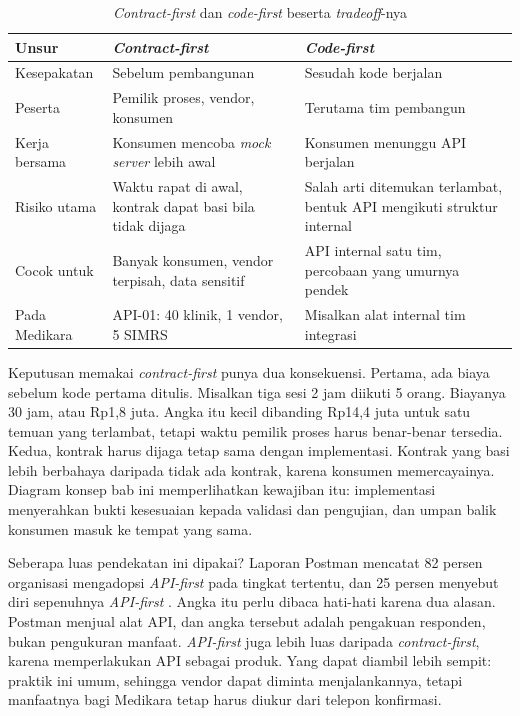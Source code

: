 \begin{table}[!htb]
  \centering
  \caption{\textit{Contract-first} dan \textit{code-first} beserta \textit{tradeoff}-nya}
  \label{tab:ch09-contract-first}
  \footnotesize
  \begin{tabularx}{\textwidth}{H{2.8cm}GG}
    \hline
    \textbf{Unsur} & \textbf{\textit{Contract-first}} & \textbf{\textit{Code-first}} \\ \hline
    Kesepakatan & Sebelum pembangunan & Sesudah kode berjalan \\ \hline
    Peserta & Pemilik proses, vendor, konsumen & Terutama tim pembangun \\ \hline
    Kerja bersama & Konsumen mencoba \textit{mock server} lebih awal & Konsumen menunggu API berjalan \\ \hline
    Risiko utama & Waktu rapat di awal, kontrak dapat basi bila tidak dijaga & Salah arti ditemukan terlambat, bentuk API mengikuti struktur internal \\ \hline
    Cocok untuk & Banyak konsumen, vendor terpisah, data sensitif & API internal satu tim, percobaan yang umurnya pendek \\ \hline
    Pada Medikara & API-01: 40 klinik, 1 vendor, 5 SIMRS & Misalkan alat internal tim integrasi \\ \hline
  \end{tabularx}
\end{table}

Keputusan memakai \textit{contract-first} punya dua konsekuensi. Pertama, ada biaya sebelum kode pertama ditulis. Misalkan tiga sesi
2 jam diikuti 5 orang. Biayanya 30 jam, atau Rp1,8 juta. Angka itu kecil dibanding Rp14,4 juta untuk satu temuan yang terlambat, tetapi
waktu pemilik proses harus benar-benar tersedia. Kedua, kontrak harus dijaga tetap sama dengan implementasi. Kontrak yang basi lebih
berbahaya daripada tidak ada kontrak, karena konsumen memercayainya. Diagram konsep bab ini memperlihatkan kewajiban itu: implementasi
menyerahkan bukti kesesuaian kepada validasi dan pengujian, dan umpan balik konsumen masuk ke tempat yang sama.

Seberapa luas pendekatan ini dipakai? Laporan Postman mencatat 82 persen organisasi mengadopsi \textit{API-first} pada tingkat tertentu,
dan 25 persen menyebut diri sepenuhnya \textit{API-first} \cite{postman2025}. Angka itu perlu dibaca hati-hati karena dua alasan. Postman
menjual alat API, dan angka tersebut adalah pengakuan responden, bukan pengukuran manfaat. \textit{API-first} juga lebih luas daripada
\textit{contract-first}, karena memperlakukan API sebagai produk. Yang dapat diambil lebih sempit: praktik ini umum, sehingga vendor
dapat diminta menjalankannya, tetapi manfaatnya bagi Medikara tetap harus diukur dari telepon konfirmasi.

